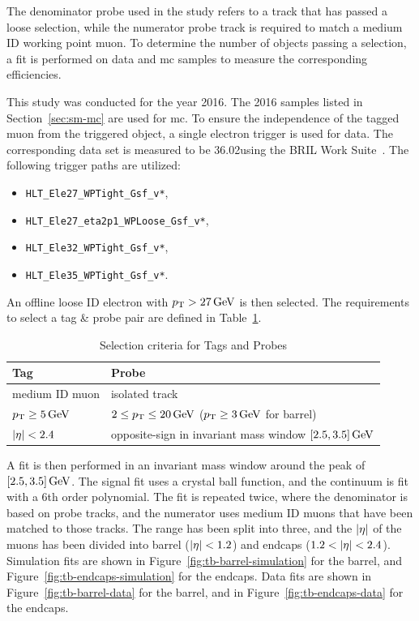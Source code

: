 The denominator probe used in the study refers to a track that has passed a loose selection, while the numerator probe track is required to match a medium ID working point muon. To determine the number of objects passing a selection, a fit is performed on data and \gls{mc} samples to measure the corresponding efficiencies.

This study was conducted for the year 2016. The 2016 samples listed in Section~\ref{sec:sm-mc} are used for \gls{mc}. To ensure the independence of the tagged muon from the triggered object, a single electron trigger is used for data. The corresponding data set is measured to be 36.02\fbinv using the BRIL Work Suite~\cite{bril}. The following trigger paths are utilized:

\begin{itemize}
\item \texttt{HLT\_Ele27\_WPTight\_Gsf\_v*},
\item \texttt{HLT\_Ele27\_eta2p1\_WPLoose\_Gsf\_v*},
\item \texttt{HLT\_Ele32\_WPTight\_Gsf\_v*},
\item \texttt{HLT\_Ele35\_WPTight\_Gsf\_v*}.
\end{itemize}

An offline loose ID electron with $p_{\mathrm{T}}>27\,\text{Ge\hspace{-.08em}V}$ is then selected. The requirements to select a tag \& probe pair are defined in Table~\ref{tab:tag-probe-def}.

\begin{table}[!htb]
	\centering
	\label{tab:tag-probe-def}
		\caption{Selection criteria for Tags and Probes}
			\begin{tabular}{l|l} \hline
			Tag & Probe \\ \hline
			medium ID muon & isolated track\\
			$p_{\mathrm{T}} \geq 5\,\text{Ge\hspace{-.08em}V}$ & $2\leq p_{\mathrm{T}}\leq 20\,\text{Ge\hspace{-.08em}V}$  ($ p_{\mathrm{T}}\geq 3 \,\text{Ge\hspace{-.08em}V} $ for barrel) \\
			$\lvert \eta \rvert<2.4$ & opposite-sign in invariant mass window $[2.5,3.5]\,\text{Ge\hspace{-.08em}V}$ \\ \hline
			\end{tabular}
\end{table}

A fit is then performed in an invariant mass window around the \JPsi peak of $[2.5,3.5]\,\text{Ge\hspace{-.08em}V}$. The signal fit uses a crystal ball function, and the continuum is fit with a 6th order polynomial. The fit is repeated twice, where the denominator is based on probe tracks, and the numerator uses medium ID muons that have been matched to those tracks. The \DR range has been split into three, and the $\lvert \eta \rvert$ of the muons has been divided into barrel ($\lvert \eta \rvert<1.2$) and endcaps ($1.2<\lvert \eta \rvert<2.4$). Simulation fits are shown in Figure~\ref{fig:tb-barrel-simulation} for the barrel, and Figure~\ref{fig:tb-endcaps-simulation} for the endcaps. Data fits are shown in Figure~\ref{fig:tb-barrel-data} for the barrel, and in Figure~\ref{fig:tb-endcaps-data} for the endcaps.

